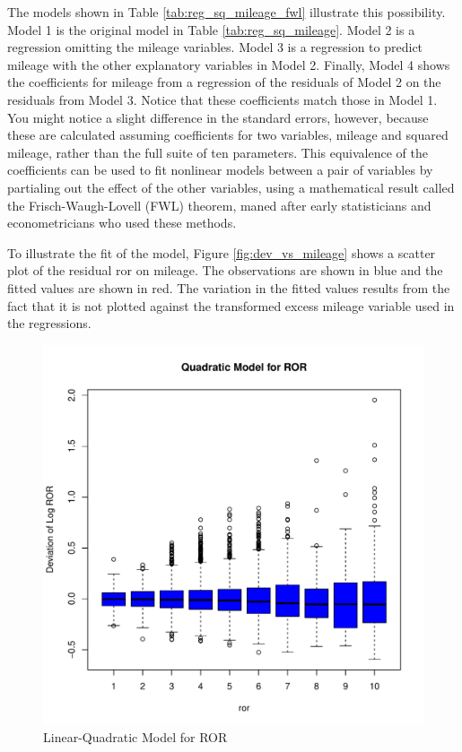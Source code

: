 \documentclass[11pt]{paper}
\begin{document}
The models shown in
Table \ref{tab:reg_sq_mileage_fwl}
illustrate this possibility. 
Model 1 is the original model in 
Table \ref{tab:reg_sq_mileage}. 
Model 2 is a regression omitting the mileage variables. 
Model 3 is a regression to predict mileage with the other explanatory variables in Model 2.
Finally, Model 4 shows the coefficients for mileage
from a regression of the residuals of Model 2
on the residuals from Model 3. 
Notice that these coefficients match those in Model 1. 
You might notice a slight difference in the standard errors, however, 
because these are calculated assuming coefficients 
for two variables, mileage and squared mileage,
rather than the full suite of ten parameters.
This equivalence of the coefficients can be used to fit
nonlinear models between a pair of variables by 
partialing out the effect of the other variables, 
using a mathematical result called the Frisch-Waugh-Lovell (FWL) theorem, 
maned after early statisticians and econometricians who used these methods. 



\pagebreak 
To illustrate the fit of the model, 
Figure \ref{fig:dev_vs_mileage} shows a scatter plot 
of the residual ror on mileage. 
The observations are shown in blue
and the fitted values are shown in red.
The variation in the fitted values results from the 
fact that it is not plotted against the transformed excess mileage variable used in the regressions.


\begin{figure}[h!]
  \centering
  \includegraphics[scale = 0.5, keepaspectratio=true]{../Figures/dev_vs_ror}
  \caption{Linear-Quadratic Model for ROR} \label{fig:dev_vs_ror}
\end{figure}
\end{document}
